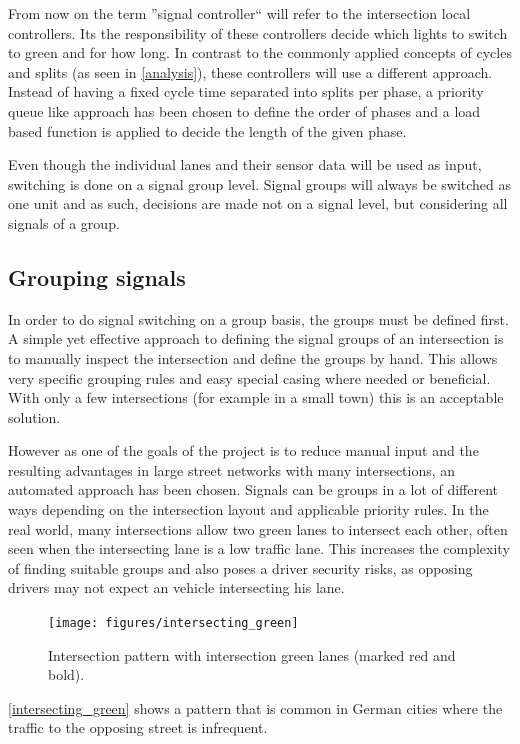 From now on the term ''signal controller`` will refer to the intersection local controllers. Its the responsibility of these controllers decide which lights to switch to green and for how long. In contrast to the commonly applied concepts of cycles and splits (as seen in \autoref{analysis}), these controllers will use a different approach. Instead of having a fixed cycle time separated into splits per phase, a priority queue like approach has been chosen to define the order of phases and a load based function is applied to decide the length of the given phase.

Even though the individual lanes and their sensor data will be used as input, switching is done on a signal group level. Signal groups will always be switched as one unit and as such, decisions are made not on a signal level, but considering all signals of a group.

\subsection*{Grouping signals}

In order to do signal switching on a group basis, the groups must be defined first. A simple yet effective approach to defining the signal groups of an intersection is to manually inspect the intersection and define the groups by hand. This allows very specific grouping rules and easy special casing where needed or beneficial. With only a few intersections (for example in a small town) this is an acceptable solution.

However as one of the goals of the project is to reduce manual input and the resulting advantages in large street networks with many intersections, an automated approach has been chosen. Signals can be groups in a lot of different ways depending on the intersection layout and applicable priority rules. In the real world, many intersections allow two green lanes to intersect each other, often seen when the intersecting lane is a low traffic lane. This increases the complexity of finding suitable groups and also poses a driver security risks, as opposing drivers may not expect an vehicle intersecting his lane.

\begin{figure}[!ht]
	\centering
	\texttt{[image: figures/intersecting\_green]}
	\label{intersecting_green}
	\caption{Intersection pattern with intersection green lanes (marked red and bold).}
\end{figure}

\autoref{intersecting_green} shows a pattern that is common in German cities where the traffic to the opposing street is infrequent.

